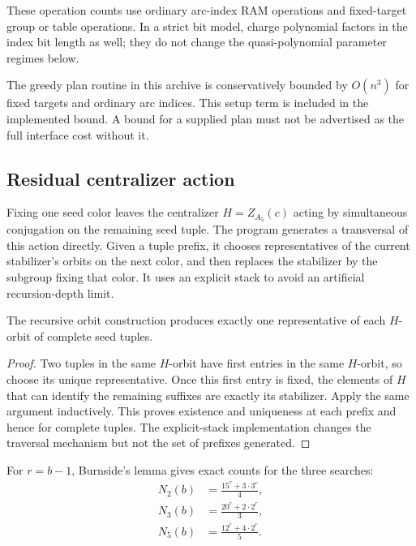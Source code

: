 These operation counts use ordinary arc-index RAM operations and fixed-target
group or table operations. In a strict bit model, charge polynomial factors
in the index bit length as well; they do not change the quasi-polynomial
parameter regimes below.

The greedy plan routine in this archive is conservatively bounded by
$O(n^3)$ for fixed targets and ordinary arc indices. This setup term is
included in the implemented bound. A bound for a supplied plan must not
be advertised as the full interface cost without it.

\subsection{Residual centralizer action}

Fixing one seed color leaves the centralizer $H=Z_{A_5}(c)$ acting by
simultaneous conjugation on the remaining seed tuple. The program
generates a transversal of this action directly. Given a tuple prefix,
it chooses representatives of the current stabilizer's orbits on the next
color, and then replaces the stabilizer by the subgroup fixing that color.
It uses an explicit stack to avoid an artificial recursion-depth limit.

\begin{lemma}
The recursive orbit construction produces exactly one representative of
each $H$-orbit of complete seed tuples.
\end{lemma}
\begin{proof}
Two tuples in the same $H$-orbit have first entries in the same $H$-orbit,
so choose its unique representative. Once this first entry is fixed, the
elements of $H$ that can identify the remaining suffixes are exactly its
stabilizer. Apply the same argument inductively. This proves existence
and uniqueness at each prefix and hence for complete tuples. The
explicit-stack implementation changes the traversal mechanism but not
the set of prefixes generated.
\end{proof}

For $r=b-1$, Burnside's lemma gives exact counts for the three searches:
\begin{align}
 N_2(b)&=\frac{15^r+3\cdot3^r}{4},\label{eq:N2}\\
 N_3(b)&=\frac{20^r+2\cdot2^r}{3},\label{eq:N3}\\
 N_5(b)&=\frac{12^r+4\cdot2^r}{5}.\label{eq:N5}
\end{align}

